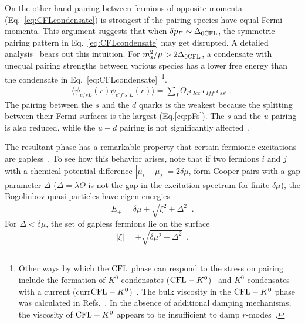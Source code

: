 \documentclass[10pt, aps, prd, superscriptaddress, nofootinbib, 
               amsmath, amssymb, twocolumn,
               preprintnumbers, showpacs,
               raggedbottom,
               floatfix]{revtex4-1}
\newcommand{\CFL}{{\rm{CFL}}}
\begin{document}
On the other hand pairing between fermions of opposite momenta
(Eq.~\ref{eq:CFLcondensate}) is strongest if the pairing species have equal
Fermi momenta. This argument suggests that when $\delta p_F\sim\Delta_{0{\rm{CFL}}}$, the
symmetric pairing pattern in Eq.~\ref{eq:CFLcondensate} may get disrupted. A
detailed analysis~\cite{Alford:2005} bears out this intuition. For
${m_s^2}/{\mu}>2\Delta_{0{\rm{CFL}}}$, a condensate with unequal pairing
strengths between various species has a lower free energy than the condensate
in Eq.~\ref{eq:CFLcondensate}~\footnote{Other ways by which the $\CFL$ phase
can respond to the stress on pairing include the formation of $K^0$ condensates
($\CFL-K^0$)~\cite{Bedaque:2001je,Schafer:2002yy,Buballa:2004sx,Forbes:2005jya,Warringa:2006dk}
and $K^0$ condensates with a current
(curr$\CFL-K^0$)~\cite{Forbes:2005jya,Kryjevski:2004kt,Gerhold:2006np,Kryjevski:2008zz}. The bulk viscosity in
the $\CFL-K^0$ phase was calculated in Refs.~\cite{Alford:2007rw,Alford:2008pb}. In the absence of
additional damping mechanisms, the viscosity of $\CFL-K^0$ appears to be
insufficient to damp $r$-modes~\cite{Rupak:2010qg}.}.
\begin{equation}
\begin{split}
\langle\psi_{cfsL}(r)\psi_{c'f's'L}(r)\rangle = \sum_I \Theta_I 
\epsilon_{Icc'}\epsilon_{Iff'}\epsilon_{ss'}\;.~\label{eq:gCFLcondensate}
\end{split}
\end{equation}
The pairing between the $s$ and the $d$ quarks is the weakest because the
splitting between their Fermi surfaces is the largest
(Eq.\ref{eq:pFs}).  The $s$ and the $u$ pairing is also reduced, while the $u-d$
pairing is not significantly affected~\cite{Alford:2005}. 

The resultant phase has a remarkable property that certain fermionic
excitations are gapless~\cite{Alford:1999xc}. To see how this behavior arises,
note that if two fermions $i$ and $j$ with a chemical potential difference
$|\mu_i-\mu_j|=2\delta\mu$, form Cooper pairs with a gap parameter $\Delta$
($\Delta=\lambda\Theta$ is not the gap in the excitation spectrum for finite
$\delta\mu$), the Bogoliubov quasi-particles have eigen-energies
\begin{equation}
E_{\pm} = \delta\mu \pm \sqrt{\xi^2+\Delta^2}~\label{eq:SplitDispersion}\;.
\end{equation}
For $\Delta<\delta\mu$, the set of gapless fermions lie on the surface 
\begin{equation}
|\xi| = \pm \sqrt{\delta\mu^2-\Delta^2}~\label{eq:GaplessXi}\;.
\end{equation}
\end{document}
